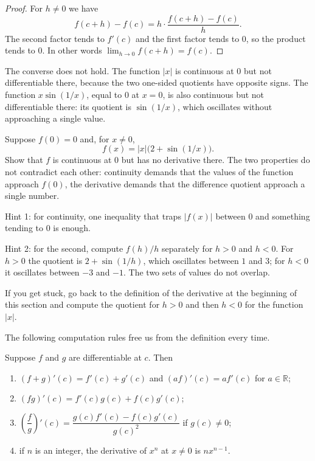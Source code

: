 \begin{proof}
For $h\neq0$ we have
\[
  f(c+h)-f(c)=h\cdot\frac{f(c+h)-f(c)}{h}.
\]
The second factor tends to $f'(c)$ and the first factor tends to $0$, so the product tends to
$0$. In other words $\lim_{h\to0}f(c+h)=f(c)$.
\end{proof}

The converse does not hold. The function $|x|$ is continuous at $0$ but not differentiable
there, because the two one-sided quotients have opposite signs. The function $x\sin(1/x)$,
equal to $0$ at $x=0$, is also continuous but not differentiable there: its quotient is
$\sin(1/x)$, which oscillates without approaching a single value.

\begin{tantangan}
Suppose $f(0)=0$ and, for $x\neq0$,
\[
  f(x)=|x|\bigl(2+\sin(1/x)\bigr).
\]
Show that $f$ is continuous at $0$ but has no derivative there. The two properties do not
contradict each other: continuity demands that the values of the function approach $f(0)$,
the derivative demands that the difference quotient approach a single number.

Hint 1: for continuity, one inequality that traps $|f(x)|$ between $0$ and something tending
to $0$ is enough.

Hint 2: for the second, compute $f(h)/h$ separately for $h>0$ and $h<0$. For $h>0$ the
quotient is $2+\sin(1/h)$, which oscillates between $1$ and $3$; for $h<0$ it oscillates
between $-3$ and $-1$. The two sets of values do not overlap.

If you get stuck, go back to the definition of the derivative at the beginning of this section
and compute the quotient for $h>0$ and then $h<0$ for the function $|x|$.
\end{tantangan}

The following computation rules free us from the definition every time.

\begin{teorema}
Suppose $f$ and $g$ are differentiable at $c$. Then
\begin{enumerate}
  \item $(f+g)'(c)=f'(c)+g'(c)$ and $(af)'(c)=a f'(c)$ for $a\in\mathbb{R}$;
  \item $(fg)'(c)=f'(c)g(c)+f(c)g'(c)$;
  \item $\left(\dfrac{f}{g}\right)'(c)=\dfrac{g(c)f'(c)-f(c)g'(c)}{g(c)^{2}}$ if
        $g(c)\neq0$;
  \item if $n$ is an integer, the derivative of $x^{n}$ at $x\neq0$ is $nx^{n-1}$.
\end{enumerate}
\end{teorema}

